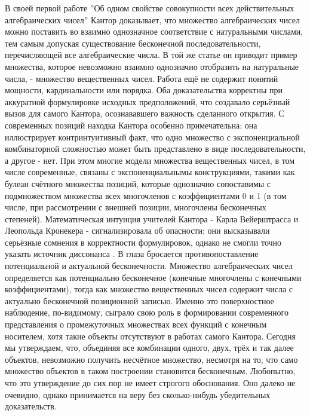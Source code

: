 \documentclass[12pt]{article}
\begin{document}
В своей первой работе ''Об одном свойстве совокупности всех действительных алгебраических чисел'' \cite{cantor-algebraic} Кантор доказывает, что множество алгебраических чисел можно поставить во взаимно однозначное соответствие с натуральными числами, тем самым допуская существование бесконечной последовательности, перечисляющей все алгебраические числа. В той же статье он приводит пример множества, которое невозможно взаимно однозначно отобразить на натуральные числа, - множество вещественных чисел. Работа ещё не содержит понятий мощности, кардинальности или порядка. Оба доказательства корректны при аккуратной формулировке исходных предположений, что создавало серьёзный вызов для самого Кантора, осознававшего важность сделанного открытия. С современных позиций находка Кантора особенно примечательна: она иллюстрирует контринтуитивный факт, что одно множество с экспоненциальной комбинаторной сложностью может быть представлено в виде последовательности, а другое - нет. При этом многие модели множества вещественных чисел, в том числе современные, связаны с экспоненциальнымы конструкциями, такими как булеан счётного множества позиций, которые однозначно сопоставимы с подмножеством множества всех многочленов с коэффициентами 0 и 1 (в том числе, при рассмотрении с внешней позиции, многочлены бесконечных степеней). Математическая интуиция учителей Кантора - Карла Вейерштрасса и Леопольда Кронекера - сигнализировала об опасности: они высказывали серьёзные сомнения в корректности формулировок, однако не смогли точно указать источник диссонанса \cite{weierstrass-kronecker}. В глаза бросается противопоставление потенциальной и актуальной бесконечности. Множество алгебраических чисел определяется как потенциально бесконечное (конечные многочлены с конечными коэффициентами), тогда как множество вещественных чисел содержит числа с актуально бесконечной позиционной записью. Именно это поверхностное наблюдение, по-видимому, сыграло свою роль в формировании современного представления о промежуточных множествах всех функций с конечным носителем, хотя такие объекты отсутствуют в работах самого Кантора. Сегодня мы утверждаем, что, объединяя все комбинации одного, двух, трёх и так далее объектов, невозможно получить несчётное множество, несмотря на то, что само множество объектов в таком построении становится бесконечным. Любопытно, что это утверждение до сих пор не имеет строгого обоснования. Оно далеко не очевидно, однако принимается на веру без сколько-нибудь убедительных доказательств.
\end{document}
